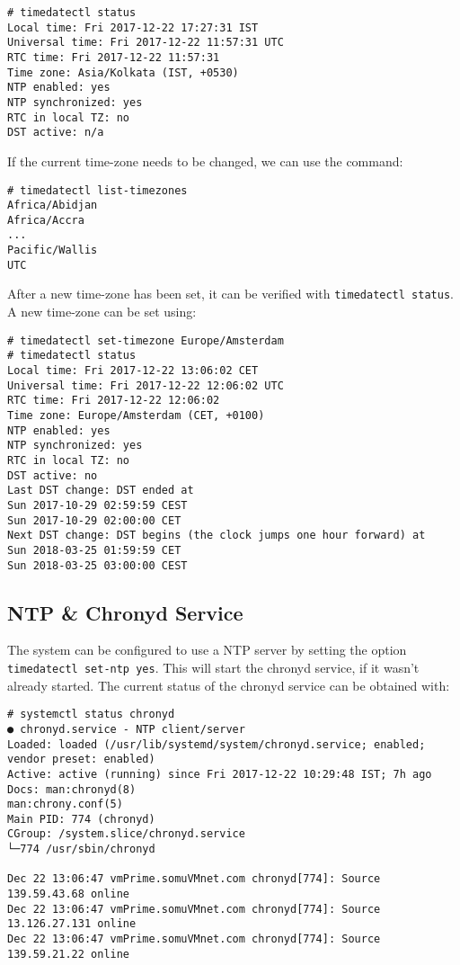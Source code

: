 \vspace{-15pt}
\begin{verbatim}
# timedatectl status
Local time: Fri 2017-12-22 17:27:31 IST
Universal time: Fri 2017-12-22 11:57:31 UTC
RTC time: Fri 2017-12-22 11:57:31
Time zone: Asia/Kolkata (IST, +0530)
NTP enabled: yes
NTP synchronized: yes
RTC in local TZ: no
DST active: n/a
\end{verbatim}
\vspace{-10pt}

\noindent
If the current time-zone needs to be changed, we can use the command:

\vspace{-15pt}
\begin{verbatim}
# timedatectl list-timezones
Africa/Abidjan
Africa/Accra
...
Pacific/Wallis
UTC
\end{verbatim}
\vspace{-10pt}

\noindent
After a new time-zone has been set, it can be verified with \verb|timedatectl status|. A new time-zone can be set using:

\vspace{-15pt}
\begin{verbatim}
# timedatectl set-timezone Europe/Amsterdam 
# timedatectl status
Local time: Fri 2017-12-22 13:06:02 CET
Universal time: Fri 2017-12-22 12:06:02 UTC
RTC time: Fri 2017-12-22 12:06:02
Time zone: Europe/Amsterdam (CET, +0100)
NTP enabled: yes
NTP synchronized: yes
RTC in local TZ: no
DST active: no
Last DST change: DST ended at
Sun 2017-10-29 02:59:59 CEST
Sun 2017-10-29 02:00:00 CET
Next DST change: DST begins (the clock jumps one hour forward) at
Sun 2018-03-25 01:59:59 CET
Sun 2018-03-25 03:00:00 CEST
\end{verbatim}
\vspace{-10pt}

\subsection{NTP \& Chronyd Service}
The system can be configured to use a NTP server by setting the option \verb|timedatectl set-ntp yes|. This will start the chronyd service, if it wasn't already started. The current status of the chronyd service can be obtained with:

\vspace{-15pt}
\begin{verbatim}
# systemctl status chronyd
● chronyd.service - NTP client/server
Loaded: loaded (/usr/lib/systemd/system/chronyd.service; enabled; vendor preset: enabled)
Active: active (running) since Fri 2017-12-22 10:29:48 IST; 7h ago
Docs: man:chronyd(8)
man:chrony.conf(5)
Main PID: 774 (chronyd)
CGroup: /system.slice/chronyd.service
└─774 /usr/sbin/chronyd

Dec 22 13:06:47 vmPrime.somuVMnet.com chronyd[774]: Source 139.59.43.68 online
Dec 22 13:06:47 vmPrime.somuVMnet.com chronyd[774]: Source 13.126.27.131 online
Dec 22 13:06:47 vmPrime.somuVMnet.com chronyd[774]: Source 139.59.21.22 online
\end{verbatim}
\vspace{-10pt}

